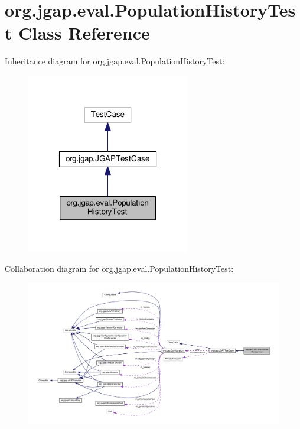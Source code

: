 \hypertarget{classorg_1_1jgap_1_1eval_1_1_population_history_test}{\section{org.\-jgap.\-eval.\-Population\-History\-Test Class Reference}
\label{classorg_1_1jgap_1_1eval_1_1_population_history_test}
}


Inheritance diagram for org.\-jgap.\-eval.\-Population\-History\-Test\-:
\nopagebreak
\begin{figure}[H]
\begin{center}
\leavevmode
\includegraphics[width=202pt]{classorg_1_1jgap_1_1eval_1_1_population_history_test__inherit__graph}
\end{center}
\end{figure}


Collaboration diagram for org.\-jgap.\-eval.\-Population\-History\-Test\-:
\nopagebreak
\begin{figure}[H]
\begin{center}
\leavevmode
\includegraphics[width=350pt]{classorg_1_1jgap_1_1eval_1_1_population_history_test__coll__graph}
\end{center}
\end{figure}

